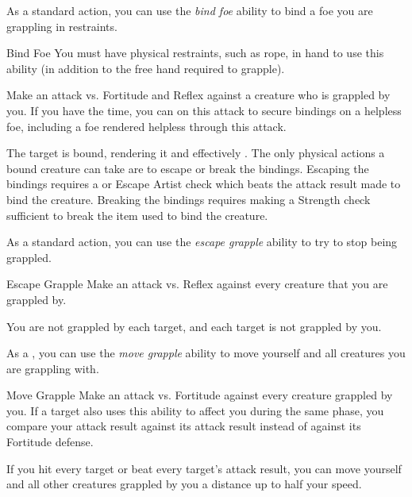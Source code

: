              As a standard action, you can use the \textit{bind foe} ability to bind a foe you are grappling in restraints.

            \begin{freeability}{Bind Foe}
                You must have physical restraints, such as rope, in hand to use this ability (in addition to the free hand required to grapple).

                Make an attack vs. Fortitude and Reflex against a creature who is grappled by you.
                If you have the time, you can  on this attack to secure bindings on a helpless foe, including a foe rendered helpless through this attack.

                \hit The target is bound, rendering it  and effectively .
                The only physical actions a bound creature can take are to escape or break the bindings.
                Escaping the bindings requires a  or Escape Artist check which beats the attack result made to bind the creature.
                Breaking the bindings requires making a Strength check sufficient to break the item used to bind the creature.
            \end{freeability}

             As a standard action, you can use the \textit{escape grapple} ability to try to stop being grappled.

            \begin{freeability}{Escape Grapple}
                Make an attack vs. Reflex against every creature that you are grappled by.

                \hit You are not grappled by each target, and each target is not grappled by you.
            \end{freeability}

             As a , you can use the \textit{move grapple} ability to move yourself and all creatures you are grappling with.

            \begin{freeability}{Move Grapple}
                Make an attack vs. Fortitude against every creature grappled by you.
                If a target also uses this ability to affect you during the same phase, you compare your attack result against its attack result instead of against its Fortitude defense.

                If you hit every target or beat every target's attack result, you can move yourself and all other creatures grappled by you a distance up to half your speed.
            \end{freeability}

